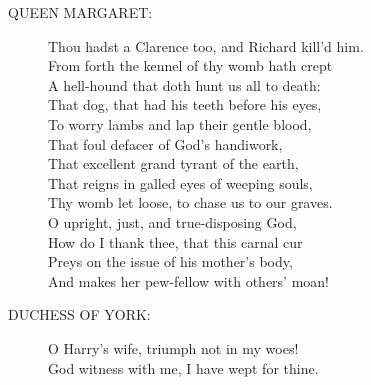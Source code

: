 \documentclass{article}
\begin{document}
\begin{description}
\item[QUEEN MARGARET:] 
\hspace{1pt}Thou hadst a Clarence too, and Richard kill'd him.\\
\hspace{1pt}From forth the kennel of thy womb hath crept\\
\hspace{1pt}A hell-hound that doth hunt us all to death:\\
\hspace{1pt}That dog, that had his teeth before his eyes,\\
\hspace{1pt}To worry lambs and lap their gentle blood,\\
\hspace{1pt}That foul defacer of God's handiwork,\\
\hspace{1pt}That excellent grand tyrant of the earth,\\
\hspace{1pt}That reigns in galled eyes of weeping souls,\\
\hspace{1pt}Thy womb let loose, to chase us to our graves.\\
\hspace{1pt}O upright, just, and true-disposing God,\\
\hspace{1pt}How do I thank thee, that this carnal cur\\
\hspace{1pt}Preys on the issue of his mother's body,\\
\hspace{1pt}And makes her pew-fellow with others' moan!\\
\end{description}
\begin{description}
\item[DUCHESS OF YORK:] 
\hspace{1pt}O Harry's wife, triumph not in my woes!\\
\hspace{1pt}God witness with me, I have wept for thine.\\
\end{description}
\end{document}

